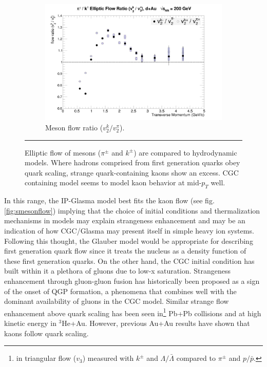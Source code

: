 \begin{figure}[hbtp]
\begin{subfigure}[h]{0.48\textwidth}
	\end{subfigure}
	\begin{subfigure}[h]{0.48\textwidth}
    \centering
    \includegraphics[width=1\textwidth]{results/v2mesonratio.jpg}
    \caption{Meson flow ratio ($v_2^{k} / v_2^{\pi}$).}
    \label{fig:mesonratio}

	\end{subfigure}

    \rule{35em}{0.5pt}
    \caption[Meson Elliptic Flow plots]{Elliptic flow of mesons ($\pi^{\pm}$ and $k^{\pm}$) are compared to hydrodynamic models. Where hadrons comprised from first generation quarks obey quark scaling, strange quark-containing kaons show an excess. CGC containing model seems to model kaon behavior at mid-$p_T$ well.}
    \label{fig:qscaledhydro}
\end{figure}

In this range, the IP-Glasma model best fits the kaon flow (see fig. \ref{fig:smesonflow}) implying that the choice of initial conditions and thermalization mechanisms in models may explain strangeness enhancement and may be an indication of how CGC/Glasma may present itself in simple heavy ion systems. Following this thought, the Glauber model would be appropriate for describing first generation quark flow since it treats the nucleus as a density function of these first generation quarks. On the other hand, the CGC initial condition has built within it a plethora of gluons due to low-x saturation. Strangeness enhancement through gluon-gluon fusion has historically been proposed as a sign of the onset of QGP formation\citep{PhysRevLett.48.1066}, a phenomena that combines well with the dominant availability of gluons in the CGC model. Similar strange flow enhancement above quark scaling has been seen in\footnote{in triangular flow ($v_3$) measured with $k^{\pm}$ and $\Lambda/\bar{\Lambda}$ compared to $\pi^{\pm}$ and $p/\bar{p}$.} Pb+Pb collisions\citep{1742-6596-668-1-012099} and at high kinetic energy in $^3$He+Au\citep{huangQM2015}. However, previous Au+Au results have shown that kaons follow quark scaling\citep{PhysRevC.92.034913}. 

